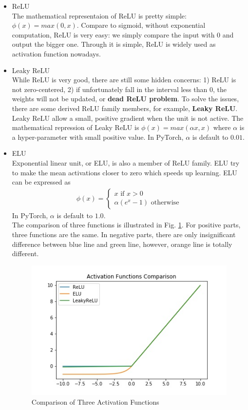 \documentclass[12pt,a4paper]{article}
\begin{document}
\begin{itemize}
\item{ReLU} \\
The mathematical representaion of ReLU is pretty simple: $\phi(x) = max(0, x)$. Compare to sigmoid, without exponential computation, ReLU is very easy: we simply compare the input with 0 and output the bigger one. Through it is simple, ReLU is widely used as activation function nowadays. 
\item{Leaky ReLU} \\
While ReLU is very good, there are still some hidden concerns: 1) ReLU is not zero-centered, 2) if unfortunately fall in the interval less than 0, the weights will not be updated, or \textbf{dead ReLU problem}. To solve the issues, there are some derived ReLU family members, for example, \textbf{Leaky ReLU}. Leaky ReLU allow a small, positive gradient when the unit is not active. The mathematical repression of Leaky ReLU is $\phi(x) = max(\alpha x, x)$ where $\alpha$ is a hyper-parameter with small positive value. In PyTorch, $\alpha$ is default to $0.01$.
\item{ELU} \\ 
Exponential linear unit, or ELU, is also a member of ReLU family. ELU try to make the mean activations closer to zero which speeds up learning. ELU can be expressed as 
\begin{align}
\phi(x)=\left\{
                 \begin{array}{ll}
                 x \text{ if $x>0$} \\
                 \alpha (e^x-1) \text{ otherwise}
                 \end{array}
                 \right.
\end{align}
In PyTorch, $\alpha$ is default to $1.0$.
\\
The comparison of three functions is illustrated in Fig. \ref{fig:activation_fun}. For positive parts, three functions are the same. In negative parts, there are only insignificant difference between blue line and green line, however, orange line is totally different.
\begin{figure}[h]
\centering
\includegraphics[scale=0.6]{Activation_Functions_Comparison.jpg}
\caption{Comparison of Three Activation Functions}
\label{fig:activation_fun}
\end{figure}

\end{itemize}
\end{document}
